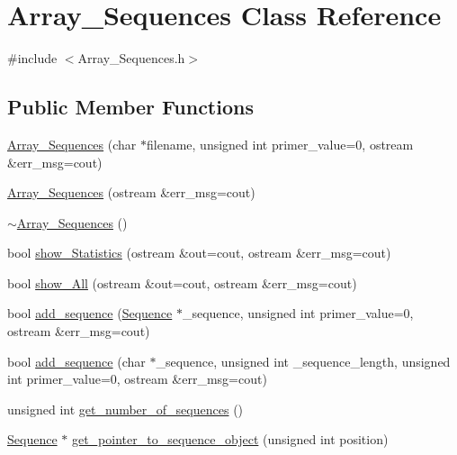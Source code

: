 \hypertarget{class_array___sequences}{}\section{Array\+\_\+\+Sequences Class Reference}
\label{class_array___sequences}


{\ttfamily \#include $<$Array\+\_\+\+Sequences.\+h$>$}

\subsection*{Public Member Functions}
\begin{DoxyCompactItemize}
\item 
\mbox{\hyperlink{class_array___sequences_a4960de248d6dceefcae88e66a5a51e8b}{Array\+\_\+\+Sequences}} (char $\ast$filename, unsigned int primer\+\_\+value=0, ostream \&err\+\_\+msg=cout)
\item 
\mbox{\hyperlink{class_array___sequences_ac33a3e2bdca116464baa042a2aea2518}{Array\+\_\+\+Sequences}} (ostream \&err\+\_\+msg=cout)
\item 
\mbox{\hyperlink{class_array___sequences_a740bb50d572c522a093f52a1c5c79e03}{$\sim$\+Array\+\_\+\+Sequences}} ()
\item 
bool \mbox{\hyperlink{class_array___sequences_ab0735daa57cd712e08843e9c79e40488}{show\+\_\+\+Statistics}} (ostream \&out=cout, ostream \&err\+\_\+msg=cout)
\item 
bool \mbox{\hyperlink{class_array___sequences_ad197ef5c061d0cfc564afe5504fa4961}{show\+\_\+\+All}} (ostream \&out=cout, ostream \&err\+\_\+msg=cout)
\item 
bool \mbox{\hyperlink{class_array___sequences_ae4e47e71792255275b01afd35456a9a0}{add\+\_\+sequence}} (\mbox{\hyperlink{class_sequence}{Sequence}} $\ast$\+\_\+sequence, unsigned int primer\+\_\+value=0, ostream \&err\+\_\+msg=cout)
\item 
bool \mbox{\hyperlink{class_array___sequences_aa5e6c65a85deac945f5d11442c4eb319}{add\+\_\+sequence}} (char $\ast$\+\_\+sequence, unsigned int \+\_\+sequence\+\_\+length, unsigned int primer\+\_\+value=0, ostream \&err\+\_\+msg=cout)
\item 
unsigned int \mbox{\hyperlink{class_array___sequences_a76fd0aa59aaf720c64088ab9c900668f}{get\+\_\+number\+\_\+of\+\_\+sequences}} ()
\item 
\mbox{\hyperlink{class_sequence}{Sequence}} $\ast$ \mbox{\hyperlink{class_array___sequences_a029592cf35f56df0714e5326a3901b74}{get\+\_\+pointer\+\_\+to\+\_\+sequence\+\_\+object}} (unsigned int position)
\end{DoxyCompactItemize}
